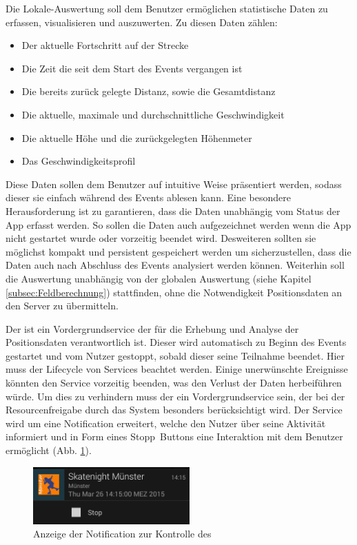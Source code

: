 Die Lokale-Auswertung soll dem Benutzer ermöglichen statistische Daten zu erfassen, visualisieren und auszuwerten. 
Zu diesen Daten zählen: 

\begin{itemize}
	\item Der aktuelle Fortschritt auf der Strecke
	\item Die Zeit die seit dem Start des Events vergangen ist
	\item Die bereits zurück gelegte Distanz, sowie die Gesamtdistanz
	\item Die aktuelle, maximale und durchschnittliche Geschwindigkeit
	\item Die aktuelle Höhe und die zurückgelegten Höhenmeter
	\item Das Geschwindigkeitsprofil
\end{itemize}

Diese Daten sollen dem Benutzer auf intuitive Weise präsentiert werden, sodass dieser sie einfach während des Events ablesen kann. Eine besondere Herausforderung ist zu garantieren, dass die Daten unabhängig vom Status der App erfasst werden. So sollen die Daten auch aufgezeichnet werden wenn die App nicht gestartet wurde oder vorzeitig beendet wird. Desweiteren sollten sie möglichst kompakt und persistent gespeichert werden um sicherzustellen, dass die Daten auch nach Abschluss des Events analysiert werden können. Weiterhin soll die Auswertung unabhängig von der globalen Auswertung (siehe Kapitel \ref{subsec:Feldberechnung}) stattfinden, ohne die Notwendigkeit Positionsdaten an den Server zu übermitteln.

Der  ist ein Vordergrundservice der für die Erhebung und Analyse der Positionsdaten verantwortlich ist. Dieser wird automatisch zu Beginn des Events gestartet und vom Nutzer gestoppt, sobald dieser seine Teilnahme beendet. Hier muss der Lifecycle von Services beachtet werden.  Einige unerwünschte Ereignisse könnten den Service vorzeitig beenden, was den Verlust der Daten herbeiführen würde. Um dies zu verhindern muss der  ein Vordergrundservice sein, der bei der Resourcenfreigabe durch das System besonders berücksichtigt wird. Der Service wird um eine Notification erweitert, welche den Nutzer über seine Aktivität informiert und in Form eines \glqq Stopp\grqq\ Buttons eine Interaktion mit dem Benutzer ermöglicht (Abb. \ref{fig:LokaleAuswertungNotification}).

\begin{figure}[htb]
\centering
\includegraphics[width=6cm]{graphics/LokaleAuswertung_Notification.png}
\caption{Anzeige der Notification zur Kontrolle des }
\label{fig:LokaleAuswertungNotification}
\end{figure}


